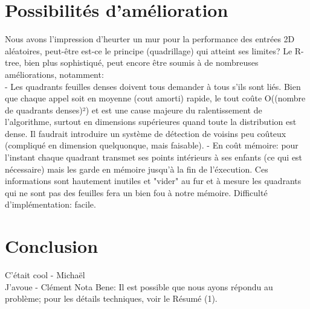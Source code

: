 \documentclass[a4paper,11pt]{article}
\begin{document}
\begin{enumerate}
\section{Possibilités d'amélioration}

Nous avons l'impression d'heurter un mur pour la performance des entrées 2D aléatoires, peut-être est-ce le principe (quadrillage) qui atteint ses limites?
\smallbreak
\bigbreak
Le R-tree, bien plus sophistiqué, peut encore être soumis à de nombreuses améliorations, notamment:\\
\smallbreak
- Les quadrants feuilles denses doivent tous demander à tous s'ils sont liés. Bien que chaque appel soit en moyenne (cout amorti) rapide, le tout coûte O((nombre de quadrants denses)²) et est une cause majeure du ralentissement de l'algorithme, surtout en dimensions supérieures quand toute la distribution est dense. Il faudrait introduire un système de détection de voisins peu coûteux (compliqué en dimension quelquonque, mais faisable).
\smallbreak
- En coût mémoire: pour l'instant chaque quadrant transmet ses points intérieurs à ses enfants (ce qui est nécessaire) mais les garde en mémoire jusqu'à la fin de l'éxecution. Ces informations sont hautement inutiles et "vider" au fur et à mesure les quadrants qui ne sont pas des feuilles fera un bien fou à notre mémoire. Difficulté d'implémentation: facile.





\section{Conclusion}
C'était cool - Michaël\\
J'avoue - Clément
\bigbreak
Nota Bene: Il est possible que nous ayons répondu au problème; pour les détails techniques, voir le Résumé (1).
\end{enumerate}
\end{document}
